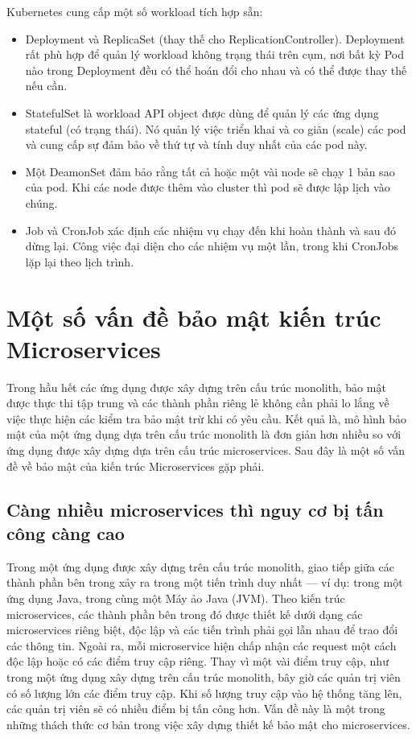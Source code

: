 \documentclass[14pt,a4paper]{book}
\begin{document}
				Kubernetes cung cấp một số workload tích hợp sẵn:
				\begin{itemize}				
					\item Deployment và ReplicaSet (thay thế cho ReplicationController). Deployment rất phù hợp để quản lý workload không trạng thái trên cụm, nơi bất kỳ Pod nào trong Deployment đều có thể hoán đổi cho nhau và có thể được thay thế nếu cần.
					\item StatefulSet là workload API object được dùng để quản lý các ứng dụng stateful (có trạng thái). Nó quản lý việc triển khai và co giãn (scale) các pod và cung cấp sự đảm bảo về thứ tự và tính duy nhất của các pod này.
					\item  Một DeamonSet đảm bảo rằng tất cả hoặc một vài node sẽ chạy 1 bản sao của pod. Khi các node được thêm vào cluster thì pod sẽ được lập lịch vào chúng.
					\item  Job và CronJob xác định các nhiệm vụ chạy đến khi hoàn thành và sau đó dừng lại. Công việc đại diện cho các nhiệm vụ một lần, trong khi CronJobs lặp lại theo lịch trình.
				\end{itemize}
	\section{Một số vấn đề bảo mật kiến trúc Microservices}
			{\hspace{0.6cm}Trong hầu hết các ứng dụng được xây dựng trên cấu trúc monolith, bảo mật được thực thi tập trung và các thành phần riêng lẻ không cần phải lo lắng về việc thực hiện các kiểm tra bảo mật trừ khi có yêu cầu. Kết quả là, mô hình bảo mật của một ứng dụng dựa trên cấu trúc monolith là đơn giản hơn nhiều so với ứng dụng được xây dựng dựa trên cấu trúc microservices. Sau đây là một số vấn đề về bảo mật của kiến trúc Microservices gặp phải.\\}			
		\subsection{Càng nhiều microservices thì nguy cơ bị tấn công càng cao}
				{\hspace{0.6cm}Trong một ứng dụng được xây dựng trên cấu trúc monolith, giao tiếp giữa các thành phần bên trong xảy ra trong một tiến trình duy nhất — ví dụ: trong một ứng dụng Java, trong cùng một Máy ảo Java (JVM). Theo kiến trúc microservices, các thành phần bên trong đó được thiết kế dưới dạng các microservices riêng biệt, độc lập và các tiến trình phải gọi lẫn nhau để trao đổi các thông tin. Ngoài ra, mỗi microservice hiện chấp nhận các request một cách độc lập hoặc có các điểm truy cập riêng. Thay vì một vài điểm truy cập, như trong một ứng dụng xây dựng trên cấu trúc monolith, bây giờ các quản trị viên có số lượng lớn các điểm truy cập. Khi số lượng truy cập vào hệ thống tăng lên, các quản trị viên sẽ có nhiều điểm bị tấn công hơn. Vấn đề này là một trong những thách thức cơ bản trong việc xây dựng thiết kế bảo mật cho microservices.\\}
\end{document}
